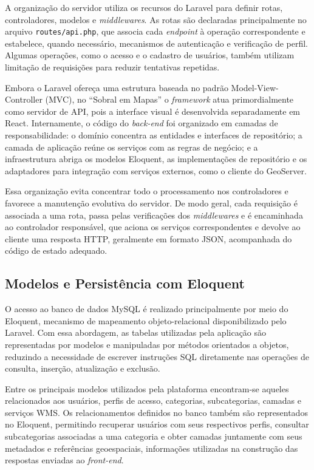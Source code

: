 A organização do servidor utiliza os recursos do Laravel para definir rotas, controladores, modelos e \textit{middlewares}. As rotas são declaradas principalmente no arquivo \texttt{routes/api.php}, que associa cada \textit{endpoint} à operação correspondente e estabelece, quando necessário, mecanismos de autenticação e verificação de perfil. Algumas operações, como o acesso e o cadastro de usuários, também utilizam limitação de requisições para reduzir tentativas repetidas.

Embora o Laravel ofereça uma estrutura baseada no padrão Model-View-Controller (MVC), no ``Sobral em Mapas'' o \textit{framework} atua primordialmente como servidor de API, pois a interface visual é desenvolvida separadamente em React. Internamente, o código do \textit{back-end} foi organizado em camadas de responsabilidade: o domínio concentra as entidades e interfaces de repositório; a camada de aplicação reúne os serviços com as regras de negócio; e a infraestrutura abriga os modelos Eloquent, as implementações de repositório e os adaptadores para integração com serviços externos, como o cliente do GeoServer.

Essa organização evita concentrar todo o processamento nos controladores e favorece a manutenção evolutiva do servidor. De modo geral, cada requisição é associada a uma rota, passa pelas verificações dos \textit{middlewares} e é encaminhada ao controlador responsável, que aciona os serviços correspondentes e devolve ao cliente uma resposta HTTP, geralmente em formato JSON, acompanhada do código de estado adequado.

\subsection{Modelos e Persistência com Eloquent}
\label{sec:eloquent-persistencia}

O acesso ao banco de dados MySQL é realizado principalmente por meio do Eloquent, mecanismo de mapeamento objeto-relacional disponibilizado pelo Laravel. Com essa abordagem, as tabelas utilizadas pela aplicação são representadas por modelos e manipuladas por métodos orientados a objetos, reduzindo a necessidade de escrever instruções SQL diretamente nas operações de consulta, inserção, atualização e exclusão.

Entre os principais modelos utilizados pela plataforma encontram-se aqueles relacionados aos usuários, perfis de acesso, categorias, subcategorias, camadas e serviços WMS. Os relacionamentos definidos no banco também são representados no Eloquent, permitindo recuperar usuários com seus respectivos perfis, consultar subcategorias associadas a uma categoria e obter camadas juntamente com seus metadados e referências geoespaciais, informações utilizadas na construção das respostas enviadas ao \textit{front-end}.

